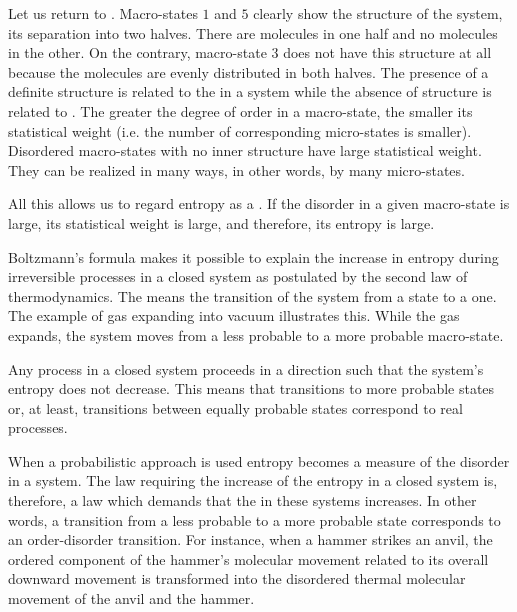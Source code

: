  Let us return to . Macro-states $\mathit{1}$ and $\mathit{5}$ clearly show the structure of the system, its separation into two halves. There are molecules in one half and no molecules in the other. On the contrary, macro-state $\mathit{3}$ does not have this structure at all because the molecules are evenly distributed in both halves. The presence of a definite structure is related to the  in a system while the absence of structure is related to . The greater the degree of order in a macro-state, the smaller its statistical weight (i.e. the number of corresponding micro-states is smaller). Disordered macro-states with no inner structure have large statistical weight. They can be realized in many ways, in other words, by many micro-states.

All this allows us to regard entropy as a . If the disorder in a given macro-state is large, its statistical weight is large, and therefore, its entropy is large.



 Boltzmann's formula makes it possible to explain the increase in entropy during irreversible processes in a closed system as postulated by the second law of thermodynamics. The  means the transition of the system from a  state to a  one. The example of gas expanding into vacuum illustrates this. While the gas expands, the system moves from a less probable to a more probable macro-state.

Any process in a closed system proceeds in a direction such that the system's entropy does not decrease. This means that transitions to more probable states or, at least, transitions between equally probable states correspond to real processes.

When a probabilistic approach is used entropy becomes a measure of the disorder in a system. The law requiring the increase of the entropy in a closed system is, therefore, a law which demands that the  in these systems increases. In other words, a transition from a less probable to a more probable state corresponds to an order-disorder transition. For instance, when a hammer strikes an anvil, the ordered component of the hammer's molecular movement related to its overall downward movement is transformed into the disordered thermal molecular movement of the anvil and the hammer.

